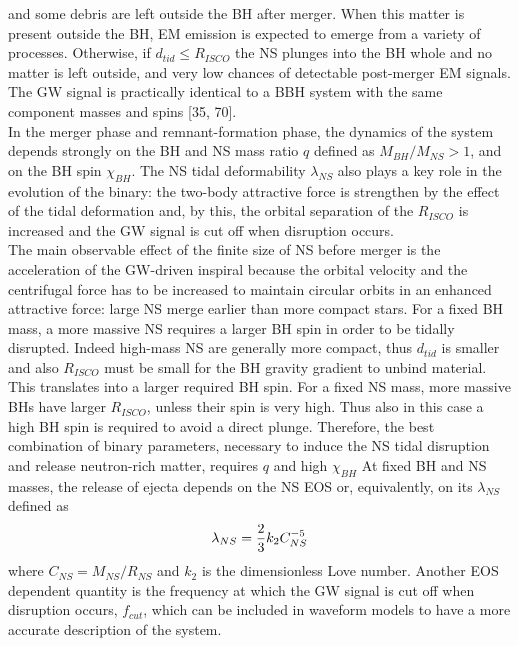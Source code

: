 \documentclass[binding=0.6cm, LaM]{sapthesis}
\begin{document}
        and some debris are left outside the BH after merger.
        When this matter is present outside the BH, EM emission is expected to emerge from a variety of processes.
        Otherwise, if $d_{tid} \leq R_{ISCO}$ the NS plunges into the BH whole and no matter is left outside,
        and very low chances of detectable post-merger EM signals.
        The GW signal is practically identical to a BBH system with the same component masses and spins [35, 70]. \\
        In the merger phase and remnant-formation phase, the dynamics of the system depends
	strongly on the BH and NS mass ratio $q$ defined as $M_{BH}/M_{NS} > 1$, and on the BH spin $\chi_{BH}$.
        The NS tidal deformability $\lambda_{NS}$ also plays a key role in the evolution of the binary:
        the two-body attractive force is strengthen by the effect of the tidal deformation and, by this,
        the orbital separation of the $R_{ISCO}$ is increased and the GW  signal  is  cut  off  when
        disruption occurs. \\
        The main observable effect of the finite size of NS before merger is the acceleration of the GW-driven inspiral
        because the orbital velocity and the centrifugal force has to be increased to maintain circular orbits
        in an enhanced attractive force: large NS merge earlier than more compact stars.
        For a fixed BH mass, a more massive NS requires a larger BH spin in order to be tidally disrupted.
        Indeed high-mass NS are generally more compact, thus $d_{tid}$ is smaller and also
        $R_{ISCO}$ must be small for the BH gravity gradient to unbind material.
        This translates into a larger required BH spin. For a fixed NS mass, more massive BHs have larger
        $R_{ISCO}$, unless their spin is very high. Thus also in this case a high BH spin is required
        to  avoid  a  direct  plunge.  Therefore,  the  best  combination  of binary parameters,
        necessary to induce the NS tidal disruption and release neutron-rich matter, requires $q$ and high $\chi_{BH}$
        At fixed BH and NS masses, the release of ejecta depends on the NS EOS or, equivalently,
        on its $\lambda_{NS}$ defined as
                \begin{equation}
                        \lambda_{NS} = {{2} \over {3}} k_2 C_{NS}^{-5}
                \end{equation}
        where $C_{NS} = M_{NS}/R_{NS}$ and $k_2$ is the dimensionless Love number.
	Another EOS dependent quantity is the frequency at which the GW signal is cut off when disruption occurs, $f_{cut}$,
	which can be included in waveform models to have a more accurate description of the system.
\end{document}
